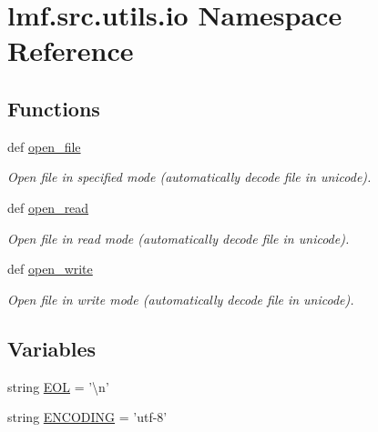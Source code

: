 \hypertarget{namespacelmf_1_1src_1_1utils_1_1io}{\section{lmf.\+src.\+utils.\+io Namespace Reference}
\label{namespacelmf_1_1src_1_1utils_1_1io}
}
\subsection*{Functions}
\begin{DoxyCompactItemize}
\item 
def \hyperlink{namespacelmf_1_1src_1_1utils_1_1io_a3cfd9f0e0184883c64f87bab4686befc}{open\+\_\+file}
\begin{DoxyCompactList}\small\item\em Open file in specified mode (automatically decode file in unicode). \end{DoxyCompactList}\item 
def \hyperlink{namespacelmf_1_1src_1_1utils_1_1io_a2659ffc6cd260a7a4e43f0546d518dff}{open\+\_\+read}
\begin{DoxyCompactList}\small\item\em Open file in read mode (automatically decode file in unicode). \end{DoxyCompactList}\item 
def \hyperlink{namespacelmf_1_1src_1_1utils_1_1io_a943b893b8992a6e46d91400538709b80}{open\+\_\+write}
\begin{DoxyCompactList}\small\item\em Open file in write mode (automatically decode file in unicode). \end{DoxyCompactList}\end{DoxyCompactItemize}
\subsection*{Variables}
\begin{DoxyCompactItemize}
\item 
string \hyperlink{namespacelmf_1_1src_1_1utils_1_1io_aba483c0f0c8e8321ce08e15fe8b8092a}{E\+O\+L} = '\textbackslash{}n'
\item 
string \hyperlink{namespacelmf_1_1src_1_1utils_1_1io_a04261d03963ca07db5192ce643168e6c}{E\+N\+C\+O\+D\+I\+N\+G} = 'utf-\/8'
\end{DoxyCompactItemize}


